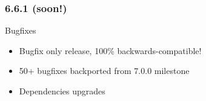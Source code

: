 \begin{frame}
\frametitle{6.6.1 (soon!)}
\begin{block}{Bugfixes}
\begin{itemize}
\item Bugfix only release, 100\% backwards-compatible!
\item 50+ bugfixes backported from 7.0.0 milestone
\item Dependencies upgrades
\end{itemize}
\end{block}

\end{frame}
